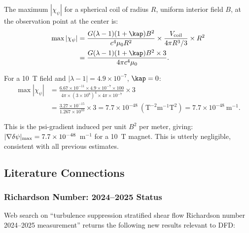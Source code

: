 \documentclass[11pt,twocolumn]{article}
\newcommand{\dpsi}{\delta\psi}
\newcommand{\lam}{\lambda}
\begin{document}
The maximum $|\chi_\psi|$ for a spherical coil of radius $R$, uniform
interior field $B$, at the observation point at the center is:
\begin{align}
\max|\chi_\psi| &= \frac{G(\lam-1)(1+\kap)B^2}{c^4\mu_0 R^2}
\times\frac{V_{\rm coil}}{4\pi R^3/3}\times R^2\nonumber\\
&= \frac{G(\lam-1)(1+\kap)B^2 \times 3}{4\pi c^4\mu_0}.
\label{eq:chi_max}
\end{align}

For a 10~T field and $|\lam-1| = 4.9\times10^{-7}$, $\kap = 0$:
\begin{align}
\max|\chi_\psi| &= \frac{6.67\times10^{-11}\times4.9\times10^{-7}\times100}
{4\pi\times(3\times10^8)^4\times4\pi\times10^{-7}}\times3
\nonumber\\
&= \frac{3.27\times10^{-15}}{1.267\times10^{33}}
\times 3
= 7.7\times10^{-48}~(\text{T}^{-2}\text{m}^{-1}\text{T}^2)
= 7.7\times10^{-48}~\text{m}^{-1}.
\end{align}

This is the psi-gradient induced per unit $B^2$ per meter, giving:
$|\nabla\dpsi|_{\rm max} = 7.7\times10^{-48}$~m$^{-1}$ for a 10~T magnet.
This is utterly negligible, consistent with all previous estimates.

\subsection{Literature Connections}
\label{sec:literature}

\subsubsection{Richardson Number: 2024--2025 Status}

Web search on ``turbulence suppression stratified shear flow Richardson number
2024--2025 measurement'' returns the following new results relevant to DFD:
\end{document}
